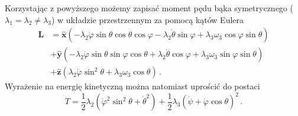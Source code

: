 \documentclass[../main.tex]{subfiles}
\begin{document}
Korzystając z powyższego możemy zapisać moment pędu bąka symetrycznego (\(\lambda_1=\lambda_2\neq\lambda_3\)) w układzie przestrzennym za pomocą kątów Eulera
\begin{equation*}
    \begin{split}
        \mathbf{L}&=\mathbf{\hat{x}}\left(-\lambda_2\dot\varphi\sin\theta\cos\theta\cos\varphi-\lambda_2\dot\theta\sin\varphi+\lambda_3\omega_3\cos\varphi\sin\theta\right)\\
        &+\mathbf{\hat{y}}\left(-\lambda_2\dot\varphi\sin\theta\sin\varphi\cos\theta+\lambda_2\dot\theta\cos\varphi+\lambda_3\omega_3\sin\varphi\sin\theta\right)\\
        &+\mathbf{\hat{z}}\left(\lambda_2\dot\varphi\sin^2\theta +\lambda_3\omega_3\cos\theta\right)\,.
    \end{split}
\end{equation*}
Wyrażenie na energię kinetyczną można natomiast uprościć do postaci
\begin{equation*}
    T=\frac{1}{2}\lambda_2(\dot{\varphi}^2\sin^2\theta+\dot{\theta}^2)+\frac{1}{2}\lambda_3(\dot\psi+\dot\varphi\cos\theta)^2\,.
\end{equation*}
\end{document}
